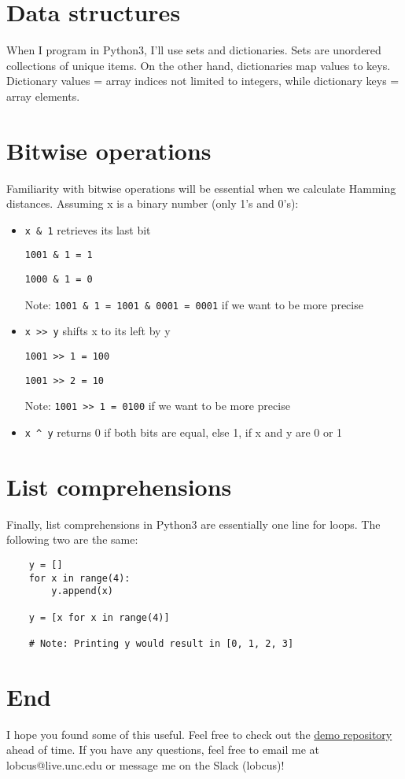 \documentclass{article}
\begin{document}
\section{Data structures}
When I program in Python3, I'll use sets and dictionaries. Sets are unordered collections of unique items. On the other hand, dictionaries map values to keys. Dictionary values = array indices not limited to integers, while dictionary keys = array elements. 

\section{Bitwise operations}
Familiarity with bitwise operations will be essential when we calculate Hamming distances. Assuming x is a binary number (only 1's and 0's):
\begin{itemize}
	\item \verb|x & 1| retrieves its last bit
		\begin{center}
			\verb|1001 & 1 = 1|

			\verb|1000 & 1 = 0|
		\end{center}
		Note: \verb|1001 & 1 = 1001 & 0001 = 0001| if we want to be more precise

	\item \verb|x >> y| shifts x to its left by y
		\begin{center}
			\verb|1001 >> 1 = 100|

			\verb|1001 >> 2 = 10|
		\end{center}
		Note: \verb|1001 >> 1 = 0100| if we want to be more precise

	\item \verb|x ^ y| returns 0 if both bits are equal, else 1, if x and y are 0 or 1
\end{itemize}

\section{List comprehensions}
Finally, list comprehensions in Python3 are essentially one line for loops. The following two are the same:
\begin{verbatim}
	y = []
	for x in range(4):
		y.append(x)
	
	y = [x for x in range(4)]

	# Note: Printing y would result in [0, 1, 2, 3]
\end{verbatim}

\section{End}
I hope you found some of this useful. Feel free to check out the \href{https://github.com/ntropy-unc/Cryptopals}{demo repository} ahead of time. If you have any questions, feel free to email me at lobcus@live.unc.edu or message me on the Slack (lobcus)!
\end{document}
